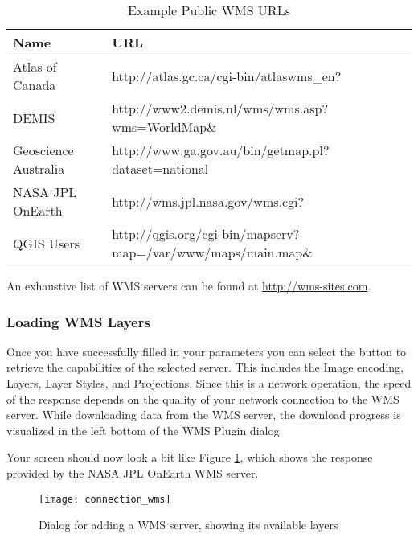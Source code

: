 \begin{table}[h]
\centering
\caption{Example Public WMS URLs}\label{tab:wms_example_urls}\medskip
 \begin{tabular}{|l|l|}
\hline \textbf{Name}        & \textbf{URL} \\
\hline Atlas of Canada      & http://atlas.gc.ca/cgi-bin/atlaswms\_en? \\
\hline DEMIS                & http://www2.demis.nl/wms/wms.asp?wms=WorldMap\& \\
\hline Geoscience Australia & http://www.ga.gov.au/bin/getmap.pl?dataset=national \\
\hline NASA JPL OnEarth     & http://wms.jpl.nasa.gov/wms.cgi? \\
\hline QGIS Users           & http://qgis.org/cgi-bin/mapserv?map=/var/www/maps/main.map\& \\
\hline
\end{tabular}
\end{table}

An exhaustive list of WMS servers can be found at \url{http://wms-sites.com}.

\subsubsection{Loading WMS Layers}\label{sec:ogc-wms-layers}

Once you have successfully filled in your parameters you can select the
button to retrieve the capabilities of the selected server.  This includes the Image encoding,
Layers, Layer Styles, and Projections.  Since this
is a network operation, the speed of the response depends on the quality of your network
connection to the WMS server. While downloading data from the WMS server, the download progress 
is visualized in the left bottom of the WMS Plugin dialog 

Your screen should now look a bit like Figure \ref{fig:connection_wms}, which shows the 
response provided by the NASA JPL OnEarth WMS server.

\begin{figure}[h]
  \begin{center}
  	\caption{Dialog for adding a WMS server, showing its available layers}\label{fig:connection_wms}
	\texttt{[image: connection\_wms]}
  \end{center}
\end{figure}

